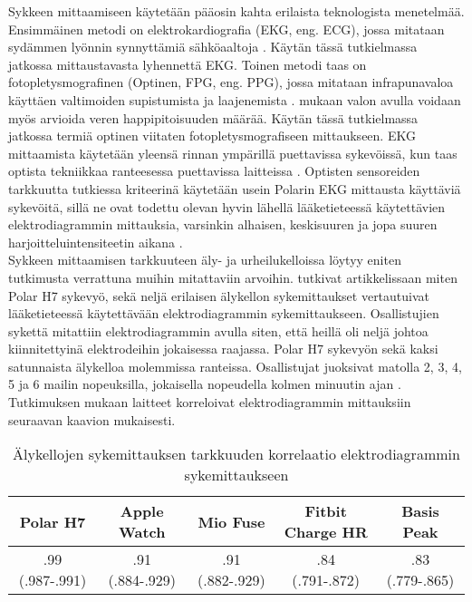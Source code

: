 \documentclass[utf8,bachelor,finnish]{bachelor}
\begin{document}
  Sykkeen mittaamiseen käytetään pääosin kahta erilaista teknologista menetelmää. Ensimmäinen metodi on elektrokardiografia (EKG, eng. ECG), jossa mitataan sydämmen lyönnin
   synnyttämiä sähköaaltoja \parencite{noauthor_heart_nodate}. Käytän tässä tutkielmassa jatkossa mittaustavasta lyhennettä EKG.
    Toinen metodi taas on fotopletysmografinen (Optinen, FPG, eng. PPG), jossa mitataan infrapunavaloa käyttäen valtimoiden supistumista ja laajenemista \parencite{noauthor_heart_nodate}.
     \cite{noauthor_heart_nodate} mukaan valon avulla voidaan myös arvioida veren happipitoisuuden määrää. Käytän tässä tutkielmassa jatkossa termiä optinen viitaten fotopletysmografiseen
      mittaukseen. EKG mittaamista käytetään yleensä rinnan ympärillä puettavissa sykevöissä, kun taas optista tekniikkaa ranteesessa puettavissa laitteissa \parencite{noauthor_heart_nodate}.
       Optisten sensoreiden tarkkuutta tutkiessa kriteerinä käytetään usein Polarin EKG mittausta käyttäviä sykevöitä, sillä ne ovat todettu olevan hyvin lähellä
        lääketieteessä käytettävien elektrodiagrammin mittauksia, varsinkin alhaisen, keskisuuren ja jopa suuren harjoitteluintensiteetin aikana \parencite{gilgen-ammann_rr_2019, nelson_accuracy_2019}.\\
  
  Sykkeen mittaamisen tarkkuuteen äly- ja urheilukelloissa löytyy eniten tutkimusta verrattuna muihin mitattaviin arvoihin.
   \cite{wang_accuracy_2017} tutkivat artikkelissaan miten Polar H7 sykevyö, sekä neljä erilaisen älykellon sykemittaukset vertautuivat lääketieteessä käytettävään
    elektrodiagrammin sykemittaukseen. Osallistujien sykettä mitattiin elektrodiagrammin avulla siten,
      että heillä oli neljä johtoa kiinnitettyinä elektrodeihin jokaisessa raajassa. Polar H7 sykevyön sekä kaksi satunnaista älykelloa molemmissa ranteissa.
       Osallistujat juoksivat matolla 2, 3, 4, 5 ja 6 mailin nopeuksilla, jokaisella nopeudella kolmen minuutin ajan \parencite{wang_accuracy_2017}.
        Tutkimuksen mukaan laitteet korreloivat elektrodiagrammin mittauksiin seuraavan kaavion mukaisesti.\\

  \begin{table}[h]
    \begin{center}
      \begin{tabular}{||c c c c c||} 
       \hline
       Polar H7 & Apple Watch & Mio Fuse & Fitbit Charge HR & Basis Peak \\ [0.5ex] 
       \hline\hline
       .99 (.987-.991) & .91 (.884-.929) & .91 (.882-.929)& .84 (.791-.872)& .83 (.779-.865)\\
       \hline
      \end{tabular}
    \caption{Älykellojen sykemittauksen tarkkuuden korrelaatio elektrodiagrammin sykemittaukseen \parencite{wang_accuracy_2017}}
      \end{center}
    \end{table}
\end{document}
